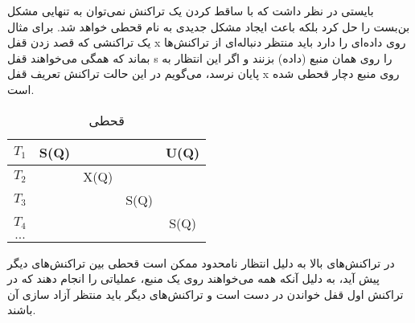 بایستی در نظر داشت که با ساقط کردن یک تراکنش نمی‌توان به تنهایی مشکل بن‌بست را
حل کرد بلکه باعث ایجاد مشکل جدیدی به نام قحطی خواهد شد.  برای مثال یک تراکنشی که
قصد زدن قفل x روی داده‌ای را دارد باید منتظر دنباله‌ای از تراکنش‌ها بماند که
همگی می‌خواهند قفل s را روی همان منبع (داده) بزنند و اگر این انتظار به پایان
نرسد، می‌گویم در این حالت تراکنش تعریف قفل x روی منبع دچار قحطی شده است.

\begin{LTR}
    \begin{table}[h]
        \begin{RTL}
            \caption{قحطی}
        \end{RTL}
        \centering
            \begin{tabular}{c|c|c|c|c}
                $T_{1}$ & S(Q) & & & U(Q) \\ \hline
                $T_{2}$ & & X(Q) & & \\ \hline
                $T_{3}$ & & & S(Q) & \\ \hline
                $T_{4}$ & & & & S(Q) \\ \hline
                $...$ & & & & \\ 
            \end{tabular}
    \end{table}
\end{LTR}

در تراکنش‌های بالا به دلیل انتظار نامحدود ممکن است قحطی بین تراکنش‌های دیگر پیش
آید، به دلیل آنکه همه می‌خواهند روی یک منبع، عملیاتی را انجام دهند که در تراکنش
اول قفل خواندن در دست است و تراکنش‌های دیگر باید منتظر آزاد سازی آن باشند.

\newpage

